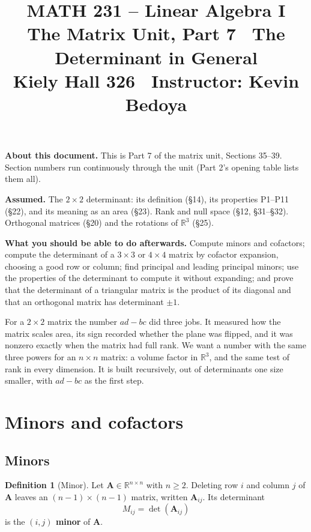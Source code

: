 \documentclass[11pt]{article}
\title{\vspace{-1.2cm}\textbf{\sffamily MATH 231 -- Linear Algebra I}\\[4pt]
       {\large\sffamily The Matrix Unit, Part 7 \textbullet\ The Determinant
        in General}\\[2pt]
       {\normalsize\sffamily Kiely Hall 326 \textbullet\
        Instructor: Kevin Bedoya}}
\author{}
\date{}
\theoremstyle{plain}
\theoremstyle{definition}
\newtheorem{defn}{Definition}[section]
\theoremstyle{remark}
\newcommand{\R}{\mathbb{R}}
\newcommand{\mt}[1]{\mathbf{#1}}
\begin{document}
\setcounter{section}{34}  %
\maketitle
\vspace{-1.6cm}

\noindent\textbf{About this document.} This is Part 7 of the matrix unit,
Sections 35--39. Section numbers run continuously through the unit (Part 2's
opening table lists them all).

\medskip
\noindent\textbf{Assumed.} The $2\times2$ determinant: its definition (\S14),
its properties P1--P11 (\S22), and its meaning as an area (\S23). Rank and
null space (\S12, \S31--\S32). Orthogonal matrices (\S20) and the rotations of
$\R^{3}$ (\S25).

\medskip
\noindent\textbf{What you should be able to do afterwards.} Compute minors and
cofactors; compute the determinant of a $3\times3$ or $4\times4$ matrix by
cofactor expansion, choosing a good row or column; find principal and leading
principal minors; use the properties of the determinant to compute it without
expanding; and prove that the determinant of a triangular matrix is the product
of its diagonal and that an orthogonal matrix has determinant $\pm1$.

\bigskip
\noindent For a $2\times2$ matrix the number $ad-bc$ did three jobs. It measured
how the matrix scales area, its sign recorded whether the plane was flipped, and
it was nonzero exactly when the matrix had full rank. We want a number with the
same three powers for an $n\times n$ matrix: a volume factor in $\R^{3}$, and the
same test of rank in every dimension. It is built recursively, out of
determinants one size smaller, with $ad-bc$ as the first step.

\section{Minors and cofactors}

\subsection{Minors}
\begin{defn}[Minor]
Let $\mt{A}\in\R^{n\times n}$ with $n\ge2$. Deleting row $i$ and column $j$ of
$\mt{A}$ leaves an $(n-1)\times(n-1)$ matrix, written $\mt{A}_{ij}$. Its
determinant
\[
  M_{ij}=\det(\mt{A}_{ij})
\]
is the \textbf{$(i,j)$ minor} of $\mt{A}$.
\end{defn}
\end{document}
